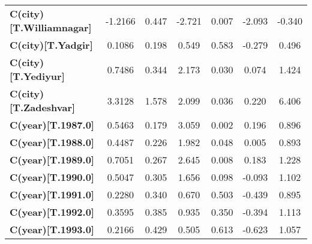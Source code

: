 \begin{center}
\begin{tabular}{lcccccc}
\textbf{C(city)[T.Williamnagar]}                                                                    &      -1.2166  &        0.447     &    -2.721  &         0.007        &       -2.093    &       -0.340     \\
\textbf{C(city)[T.Yadgir]}                                                                          &       0.1086  &        0.198     &     0.549  &         0.583        &       -0.279    &        0.496     \\
\textbf{C(city)[T.Yediyur]}                                                                         &       0.7486  &        0.344     &     2.173  &         0.030        &        0.074    &        1.424     \\
\textbf{C(city)[T.Zadeshvar]}                                                                       &       3.3128  &        1.578     &     2.099  &         0.036        &        0.220    &        6.406     \\
\textbf{C(year)[T.1987.0]}                                                                          &       0.5463  &        0.179     &     3.059  &         0.002        &        0.196    &        0.896     \\
\textbf{C(year)[T.1988.0]}                                                                          &       0.4487  &        0.226     &     1.982  &         0.048        &        0.005    &        0.893     \\
\textbf{C(year)[T.1989.0]}                                                                          &       0.7051  &        0.267     &     2.645  &         0.008        &        0.183    &        1.228     \\
\textbf{C(year)[T.1990.0]}                                                                          &       0.5047  &        0.305     &     1.656  &         0.098        &       -0.093    &        1.102     \\
\textbf{C(year)[T.1991.0]}                                                                          &       0.2280  &        0.340     &     0.670  &         0.503        &       -0.439    &        0.895     \\
\textbf{C(year)[T.1992.0]}                                                                          &       0.3595  &        0.385     &     0.935  &         0.350        &       -0.394    &        1.113     \\
\textbf{C(year)[T.1993.0]}                                                                          &       0.2166  &        0.429     &     0.505  &         0.613        &       -0.623    &        1.057     \\

\end{tabular}
\end{center}
